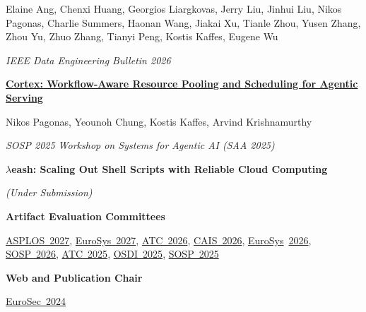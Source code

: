 \documentclass[margin,11pt]{resume}
\newcommand{\cvName}{Nikos Pagonas}
\newcommand{\subsectionVSpace}{\vspace{4.5ex}\xspace}
\newcommand{\sectionVSpace}{\vspace{1ex}\xspace} %
\newcommand{\serviceVSpace}{\vspace{2ex}\xspace} %
\newcommand{\publicationVSpace}{\vspace{3ex}\xspace} %
\newcommand{\authors}[1]{#1\xspace}
\newcommand{\me}{\cvName\xspace}
\newcommand{\paperTitle}[1]{\textbf{#1}}
\newcommand{\serviceRole}[1]{\textbf{#1}\xspace}
\newcommand{\underSubmission}{\textit{(Under Submission)}\xspace}
\newcommand{\venue}[1]{\textit{#1}\xspace}
\newlength{\cvsectionbodyoffset}
\newlength{\cvsectionwidestheaderwidth}
\newcommand{\recordCvSectionHeaderWidth}{%
	\ifdim\wd\cvsectionheaderbox>\cvsectionwidestheaderwidth
		\global\cvsectionwidestheaderwidth=\wd\cvsectionheaderbox
	\fi
}
\newcommand{\entryNeedspace}{\par\Needspace{2\baselineskip}}
\newenvironment{publicationItem}{\entryNeedspace}{\par\publicationVSpace} %
\newenvironment{rSection}[1]{%
	\par
	\setCvSectionHeader{#1}%
	\recordCvSectionHeaderWidth%
	\begin{list}{}{%
		\setlength{\leftmargin}{\cvsectionbodyoffset}%
		\setlength{\rightmargin}{0pt}%
		\setlength{\labelwidth}{\cvsectionbodyoffset}%
		\setlength{\labelsep}{0pt}%
		\setlength{\itemindent}{0pt}%
		\setlength{\listparindent}{0pt}%
		\setlength{\topsep}{0pt}%
		\setlength{\partopsep}{0pt}%
		\setlength{\parsep}{0pt}%
		\setlength{\itemsep}{0pt}%
		\renewcommand{\makelabel}[1]{\makebox[\labelwidth][l]{\raisebox{0pt}[0pt][0pt]{##1}}}%
	}%
	\item[\usebox{\cvsectionheaderbox}]%
}{\end{list}\sectionVSpace\par}
\newenvironment{serviceItem}{\entryNeedspace}{\par\serviceVSpace} %
\begin{document}
\begin{resume}
\begin{rSection}{Publications}
\begin{publicationItem}
			\authors{Elaine Ang, Chenxi Huang, Georgios Liargkovas, Jerry Liu, Jinhui Liu, \me, Charlie Summers, Haonan Wang, Jiakai Xu, Tianle Zhou, Yusen Zhang, Zhou Yu, Zhuo Zhang, Tianyi Peng, Kostis Kaffes, Eugene Wu}

			\venue{IEEE Data Engineering Bulletin 2026}
		\end{publicationItem}

		\begin{publicationItem}
			\href{https://saa2025.github.io/papers/Cortex%20-%20Workflow-Aware%20Resource%20Pooling%20and%20Scheduling%20for%20Agentic%20Serving.pdf}{\paperTitle{Cortex: Workflow-Aware Resource Pooling and Scheduling for Agentic Serving}}

			\authors{\me, Yeounoh Chung, Kostis Kaffes, Arvind Krishnamurthy}

			\venue{SOSP 2025 Workshop on Systems for Agentic AI (SAA 2025)}
		\end{publicationItem}

		\begin{publicationItem}
			\paperTitle{\( \lambda \)eash: Scaling Out Shell Scripts with Reliable Cloud Computing}

			\underSubmission
		\end{publicationItem}
	\end{rSection}

	\begin{rSection}{Service}
		\begin{serviceItem}
			\serviceRole{Artifact Evaluation Committees}

			\href{https://asplos27ae-summer.hotcrp.com/users/pc}{ASPLOS~2027},
			\href{https://eurosys27-ae-spring.hotcrp.com/users/pc}{EuroSys~2027},
			\href{https://atc26ae.hotcrp.com/users/pc}{ATC~2026},
			\href{https://cais26-ae.hotcrp.com/users/pc}{CAIS~2026},
			\href{https://eurosys26-ae-spring.hotcrp.com/users/pc}{EuroSys}~\href{https://eurosys26-ae-fall.hotcrp.com/users/pc}{2026},
			\href{https://sosp26ae.hotcrp.com/users/pc}{SOSP~2026},
			\href{https://atc25ae.usenix.hotcrp.com/users/pc}{ATC~2025},
			\href{https://osdi25ae.usenix.hotcrp.com/users/pc}{OSDI~2025},
			\href{https://sosp25ae.hotcrp.com/users/pc}{SOSP~2025}
		\end{serviceItem}

		\begin{serviceItem}
			\serviceRole{Web and Publication Chair}

			\href{https://secopera.eu/eurosec-2024/}{EuroSec~2024}
		\end{serviceItem}
	\end{rSection}


\end{resume}
\end{document}
